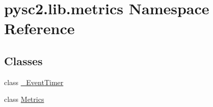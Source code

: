 \hypertarget{namespacepysc2_1_1lib_1_1metrics}{}\section{pysc2.\+lib.\+metrics Namespace Reference}
\label{namespacepysc2_1_1lib_1_1metrics}
\subsection*{Classes}
\begin{DoxyCompactItemize}
\item 
class \mbox{\hyperlink{classpysc2_1_1lib_1_1metrics_1_1___event_timer}{\+\_\+\+Event\+Timer}}
\item 
class \mbox{\hyperlink{classpysc2_1_1lib_1_1metrics_1_1_metrics}{Metrics}}
\end{DoxyCompactItemize}
